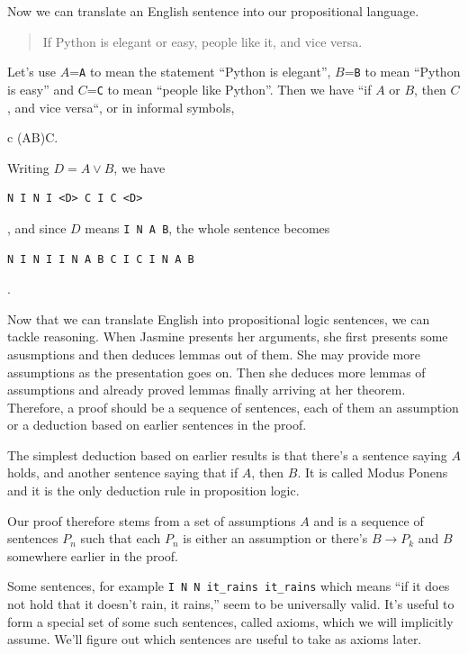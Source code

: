 \documentclass[11pt,oneside,%
]{memoir}
\newenvironment{eqna}{\begin{IEEEeqnarray}{c}}{\end{IEEEeqnarray}\ignorespacesafterend}
\theoremstyle{definition}
\newcommand{\propositio}{\lstinline[language=propositio]}
\begin{document}
Now we can translate an English sentence into our propositional language.
\begin{quote}
    If Python is elegant or easy, people like it, and vice versa.
\end{quote}
Let's use \(A\)=\lstinline[language=propositio]!A! to mean the statement ``Python is elegant'', \(B\)=\lstinline[language=propositio]!B! to mean ``Python is easy'' and \(C\)=\lstinline[language=propositio]!C! to mean ``people like Python''. Then we have ``if \(A\) or \(B\), then \(C\), and vice versa``, or in informal symbols,
\begin{eqna}
    (A\vee B)\leftrightarrow C.
\end{eqna}
Writing \(D=A\vee B\), we have
\begin{lstlisting}[language=propositio]
N I N I <D> C I C <D>
\end{lstlisting}
, and since \(D\) means \lstinline[language=propositio]!I N A B!, the whole sentence becomes
\begin{lstlisting}[language=propositio]
N I N I I N A B C I C I N A B
\end{lstlisting}
.

Now that we can translate English into propositional logic sentences, we can tackle reasoning. When Jasmine presents her arguments, she first presents some asusmptions and then deduces lemmas out of them. She may provide more assumptions as the presentation goes on. Then she deduces more lemmas of assumptions and already proved lemmas finally arriving at her theorem. Therefore, a proof should be a sequence of sentences, each of them an assumption or a deduction based on earlier sentences in the proof.

The simplest deduction based on earlier results is that there's a sentence saying \(A\) holds, and another sentence saying that if \(A\), then \(B\). It is called Modus Ponens and it is the only deduction rule in proposition logic.

Our proof therefore stems from a set of assumptions \(A\) and is a sequence of sentences \(P_n\) such that each \(P_n\) is either an assumption or there's \(B\rightarrow P_k\) and \(B\) somewhere earlier in the proof.

Some sentences, for example \propositio!I N N it_rains it_rains! which means ``if it does not hold that it doesn't rain, it rains,'' seem to be universally valid. It's useful to form a special set of some such  sentences, called axioms, which we will implicitly assume. We'll figure out which sentences are useful to take as axioms later.%
\end{document}
